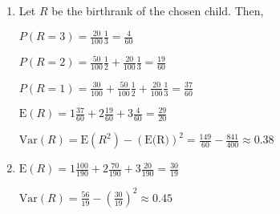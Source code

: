 \begin{enumerate}[label=(\alph*)]
\item Let $R$ be the birthrank of the chosen child. Then,

$P(R=3) = \frac{20}{100}\frac{1}{3} = \frac{4}{60}$

$P(R=2) = \frac{50}{100}\frac{1}{2} + \frac{20}{100}\frac{1}{3} =
\frac{19}{60}$

$P(R=1) = \frac{30}{100} + \frac{50}{100}\frac{1}{2} + \frac{20}{100}\frac{1}{3}
= \frac{37}{60}$

$\text{E}(R) = 1\frac{37}{60} + 2\frac{19}{60} + 3\frac{4}{60} = \frac{29}{20}$

$\text{Var}(R) = \text{E}(R^{2}) - (\text{E(R)})^{2} = \frac{149}{60} -
\frac{841}{400} \approx 0.38$

\item 
$\text{E}(R) = 1\frac{100}{190} + 2\frac{70}{190} + 3\frac{20}{190} =
\frac{30}{19}$

$\text{Var}(R) = \frac{56}{19} - (\frac{30}{19})^{2} \approx 0.45$
\end{enumerate}